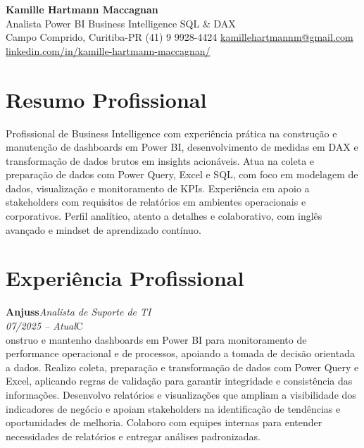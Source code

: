 \documentclass[11pt,a4paper]{article}
\newcommand{\cvrole}[4]{%
  \vspace{4pt}%
  {\bfseries\color{accentcolor}#1}\hfill{\itshape #2}\\[-2pt]%
  {\itshape #3}\hfill #4\\[6pt]%
}
\begin{document}
\begin{center}
  {\fontsize{20}{24}\selectfont\bfseries Kamille Hartmann Maccagnan}\\[8pt]
  {\large Analista Power BI \textbar{} Business Intelligence \textbar{} SQL \& DAX}\\[10pt]
  Campo Comprido, Curitiba-PR \enspace\textbullet\enspace (41) 9 9928-4424 \enspace\textbullet\enspace
  \href{mailto:kamillehartmannm@gmail.com}{kamillehartmannm@gmail.com}\\[3pt]
  \href{https://linkedin.com/in/kamille-hartmann-maccagnan/}{linkedin.com/in/kamille-hartmann-maccagnan/}
\end{center}

\vspace{6pt}

\section{Resumo Profissional}

Profissional de Business Intelligence com experiência prática na construção e manutenção de dashboards em Power BI, desenvolvimento de medidas em DAX e transformação de dados brutos em insights acionáveis. Atua na coleta e preparação de dados com Power Query, Excel e SQL, com foco em modelagem de dados, visualização e monitoramento de KPIs. Experiência em apoio a stakeholders com requisitos de relatórios em ambientes operacionais e corporativos. Perfil analítico, atento a detalhes e colaborativo, com inglês avançado e mindset de aprendizado contínuo.

\section{Experiência Profissional}

\cvrole{Anjuss}{Analista de Suporte de TI}{07/2025 -- Atual}

Construo e mantenho dashboards em Power BI para monitoramento de performance operacional e de processos, apoiando a tomada de decisão orientada a dados. Realizo coleta, preparação e transformação de dados com Power Query e Excel, aplicando regras de validação para garantir integridade e consistência das informações. Desenvolvo relatórios e visualizações que ampliam a visibilidade dos indicadores de negócio e apoiam stakeholders na identificação de tendências e oportunidades de melhoria. Colaboro com equipes internas para entender necessidades de relatórios e entregar análises padronizadas.
\end{document}
